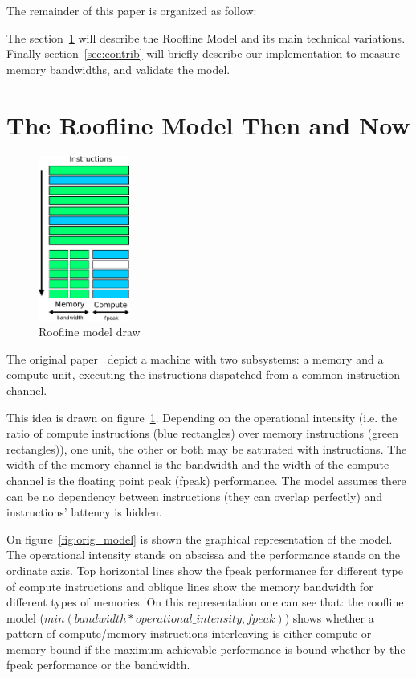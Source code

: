 \documentclass[runningheads,a4paper]{llncs}
\begin{document}
The remainder of this paper is organized as follow:

The section~\ref{sec:state_of_art} will describe the Roofline Model and its main technical variations.
Finally section~\ref{sec:contrib} will briefly describe our implementation to measure memory bandwidths, and validate the model.

\section{The Roofline Model Then and Now}
\label{sec:state_of_art}

\begin{figure}
  \centering
  \includegraphics[width=30mm]{pictures/model_drawing}
  \caption{Roofline model draw}
  \label{fig:roofline_draw}
\end{figure}

The original paper~\cite{Williams:2009:RIV:1498765.1498785} depict a machine with two subsystems: a memory and a compute unit,
executing the instructions dispatched from a common instruction channel.

This idea is drawn on figure~\ref{fig:roofline_draw}.
Depending on the operational intensity (i.e. the ratio of compute instructions (blue rectangles) over memory instructions (green rectangles)),
one unit, the other or both may be saturated with instructions. The width of the memory channel is the bandwidth and the width
of the compute channel is the floating point peak (fpeak) performance. The model assumes there can be no dependency between
instructions (they can overlap perfectly) and instructions' lattency is hidden.

On figure~\ref{fig:orig_model} is shown the graphical representation of the model.
The operational intensity stands on abscissa and the performance stands on the ordinate axis.
Top horizontal lines show the fpeak performance for different type of compute instructions and
oblique lines show the memory bandwidth for different types of memories. On this representation
one can see that: the roofline model ($min(bandwidth*operational\_intensity, fpeak)$) shows whether a pattern of compute/memory
instructions interleaving is either compute or memory bound if the maximum achievable performance is bound whether by the fpeak
performance or the bandwidth.
\end{document}
